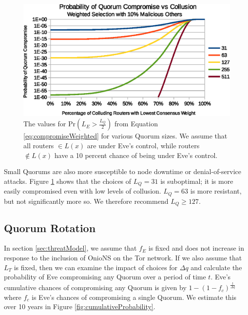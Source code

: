 \documentclass[USenglish,oneside,twocolumn]{article}
\begin{document}
\begin{figure}[h]
	\centering
	\includegraphics[width=\linewidth]{../assets/analysis/QuorumSelectionWeighted10.eps}
	\caption{The values for $ \mathrm{Pr}(L_{E} > \frac{L_{Q}}{2}) $ from Equation \ref{eq:compromiseWeighted} for various Quorum sizes. We assume that all routers $ \in L(x) $ are under Eve's control, while routers $ \notin L(x) $ have a 10 percent chance of being under Eve's control.}
	\label{fig:quorumWeightedMajority}
\end{figure}

Small Quorums are also more susceptible to node downtime or denial-of-service attacks. Figure \ref{fig:quorumWeightedMajority} shows that the choices of $ L_{Q} = 31 $ is suboptimal; it is more easily compromised even with low levels of collusion. $ L_{Q} = 63 $ is more resistant, but not significantly more so. We therefore recommend $ L_{Q} \geq 127 $.

\subsection{Quorum Rotation} %

In section \ref{sec:threatModel}, we assume that $ f_{E} $ is fixed and does not increase in response to the inclusion of OnioNS on the Tor network. If we also assume that $ L_{T} $ is fixed, then we can examine the impact of choices for $ \Delta q $ and calculate the probability of Eve compromising any Quorum over a period of time $ t $. Eve's cumulative chances of compromising any Quorum is given by $ 1 - (1 - f_{c})^{\frac{t}{\Delta q}} $ where $ f_{c} $ is Eve's chances of compromising a single Quorum. We estimate this over 10 years in Figure \ref{fig:cumulativeProbability}.
\end{document}
